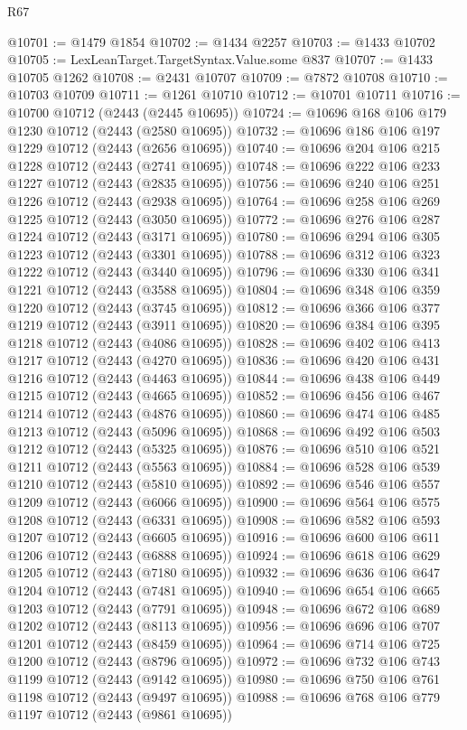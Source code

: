 \begin{lexlean}{R67}
\begin{coremodule}
@10701 := @1479 @1854
@10702 := @1434 @2257
@10703 := @1433 @10702
@10705 := LexLeanTarget.TargetSyntax.Value.some @837
@10707 := @1433 @10705 @1262
@10708 := @2431 @10707
@10709 := @7872 @10708
@10710 := @10703 @10709
@10711 := @1261 @10710
@10712 := @10701 @10711
@10716 := @10700 @10712 (@2443 (@2445 @10695))
@10724 := @10696 @168 @106 @179 @1230 @10712 (@2443 (@2580 @10695))
@10732 := @10696 @186 @106 @197 @1229 @10712 (@2443 (@2656 @10695))
@10740 := @10696 @204 @106 @215 @1228 @10712 (@2443 (@2741 @10695))
@10748 := @10696 @222 @106 @233 @1227 @10712 (@2443 (@2835 @10695))
@10756 := @10696 @240 @106 @251 @1226 @10712 (@2443 (@2938 @10695))
@10764 := @10696 @258 @106 @269 @1225 @10712 (@2443 (@3050 @10695))
@10772 := @10696 @276 @106 @287 @1224 @10712 (@2443 (@3171 @10695))
@10780 := @10696 @294 @106 @305 @1223 @10712 (@2443 (@3301 @10695))
@10788 := @10696 @312 @106 @323 @1222 @10712 (@2443 (@3440 @10695))
@10796 := @10696 @330 @106 @341 @1221 @10712 (@2443 (@3588 @10695))
@10804 := @10696 @348 @106 @359 @1220 @10712 (@2443 (@3745 @10695))
@10812 := @10696 @366 @106 @377 @1219 @10712 (@2443 (@3911 @10695))
@10820 := @10696 @384 @106 @395 @1218 @10712 (@2443 (@4086 @10695))
@10828 := @10696 @402 @106 @413 @1217 @10712 (@2443 (@4270 @10695))
@10836 := @10696 @420 @106 @431 @1216 @10712 (@2443 (@4463 @10695))
@10844 := @10696 @438 @106 @449 @1215 @10712 (@2443 (@4665 @10695))
@10852 := @10696 @456 @106 @467 @1214 @10712 (@2443 (@4876 @10695))
@10860 := @10696 @474 @106 @485 @1213 @10712 (@2443 (@5096 @10695))
@10868 := @10696 @492 @106 @503 @1212 @10712 (@2443 (@5325 @10695))
@10876 := @10696 @510 @106 @521 @1211 @10712 (@2443 (@5563 @10695))
@10884 := @10696 @528 @106 @539 @1210 @10712 (@2443 (@5810 @10695))
@10892 := @10696 @546 @106 @557 @1209 @10712 (@2443 (@6066 @10695))
@10900 := @10696 @564 @106 @575 @1208 @10712 (@2443 (@6331 @10695))
@10908 := @10696 @582 @106 @593 @1207 @10712 (@2443 (@6605 @10695))
@10916 := @10696 @600 @106 @611 @1206 @10712 (@2443 (@6888 @10695))
@10924 := @10696 @618 @106 @629 @1205 @10712 (@2443 (@7180 @10695))
@10932 := @10696 @636 @106 @647 @1204 @10712 (@2443 (@7481 @10695))
@10940 := @10696 @654 @106 @665 @1203 @10712 (@2443 (@7791 @10695))
@10948 := @10696 @672 @106 @689 @1202 @10712 (@2443 (@8113 @10695))
@10956 := @10696 @696 @106 @707 @1201 @10712 (@2443 (@8459 @10695))
@10964 := @10696 @714 @106 @725 @1200 @10712 (@2443 (@8796 @10695))
@10972 := @10696 @732 @106 @743 @1199 @10712 (@2443 (@9142 @10695))
@10980 := @10696 @750 @106 @761 @1198 @10712 (@2443 (@9497 @10695))
@10988 := @10696 @768 @106 @779 @1197 @10712 (@2443 (@9861 @10695))

\end{coremodule}
\end{lexlean}
